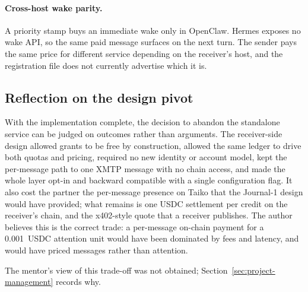 \paragraph{Cross-host wake parity.}
A priority stamp buys an immediate wake only in OpenClaw. Hermes exposes no wake API, so
the same paid message surfaces on the next turn. The sender pays the same price for
different service depending on the receiver's host, and the registration file does not
currently advertise which it is.

\subsection{Reflection on the design pivot}

With the implementation complete, the decision to abandon the standalone service can be
judged on outcomes rather than arguments. The receiver-side design allowed grants to be
free by construction, allowed the same ledger to drive both quotas and pricing, required
no new identity or account model, kept the per-message path to one XMTP message with no
chain access, and made the whole layer opt-in and backward compatible with a single
configuration flag. It also cost the partner the per-message presence on Taiko that the
Journal-1 design would have provided; what remains is one USDC settlement per credit on
the receiver's chain, and the x402-style quote that a receiver publishes. The author
believes this is the correct trade: a per-message on-chain payment for a 0.001~USDC
attention unit would have been dominated by fees and latency, and would have priced
messages rather than attention.

The mentor's view of this trade-off was not obtained; Section~\ref{sec:project-management}
records why.
